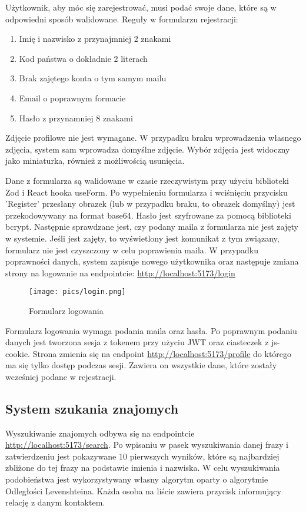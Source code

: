 \documentclass{article}
\begin{document}
Użytkownik, aby móc się zarejestrować, musi podać swoje dane, które są w odpowiedni sposób walidowane. Reguły w formularzu rejestracji:
\begin{enumerate}
    \item Imię i nazwisko z przynajmniej 2 znakami
    \item Kod państwa o dokładnie 2 literach
    \item Brak zajętego konta o tym samym mailu
    \item Email o poprawnym formacie
    \item Hasło z przynamniej 8 znakami
\end{enumerate}

Zdjęcie profilowe nie jest wymagane. W przypadku braku wprowadzenia własnego zdjęcia, system sam wprowadza domyślne zdjęcie. Wybór zdjęcia jest widoczny jako miniaturka, również z możliwością usunięcia.

Dane z formularza są walidowane w czasie rzeczywistym przy użyciu biblioteki Zod
i React hooka useForm. Po wypełnieniu formularza i wciśnięciu przycisku 'Register'
przesłany obrazek (lub w przypadku braku, to obrazek domyślny) jest przekodowywany
na format base64. Hasło jest szyfrowane za pomocą biblioteki bcrypt. Następnie
sprawdzane jest, czy podany maila z formularza nie jest zajęty w systemie.
Jeśli jest zajęty, to wyświetlony jest komunikat z tym związany, formularz
nie jest czyszczony w celu poprawienia maila. W przypadku poprawności danych,
system zapisuje nowego użytkownika oraz następuje zmiana strony
na logowanie na endpointcie: \url{http://localhost:5173/login}

\begin{figure}[h]
    \centering
    \texttt{[image: pics/login.png]}
    \caption*{Formularz logowania}
\end{figure}

Formularz logowania wymaga podania maila oraz hasła. Po poprawnym podaniu danych jest tworzona sesja z tokenem przy użyciu JWT oraz ciasteczek z js-cookie. Strona zmienia się na endpoint
\url{http://localhost:5173/profile} do którego ma się tylko dostęp podczas sesji. Zawiera on wszystkie dane, które zostały wcześniej podane w rejestracji.

\newpage
\subsection{System szukania znajomych}
Wyszukiwanie znajomych odbywa się na endpointcie \url{http://localhost:5173/search}. Po wpisaniu w pasek wyszukiwania danej frazy i zatwierdzeniu jest pokazywane 10 pierwszych wyników, które są najbardziej zbliżone do tej frazy na podstawie imienia i nazwiska. W celu wyszukiwania podobieństwa jest wykorzystywany własny algorytm oparty o algorytmie Odległości Levenshteina. Każda osoba na liście zawiera przycisk informujący relację z danym kontaktem.
\end{document}
